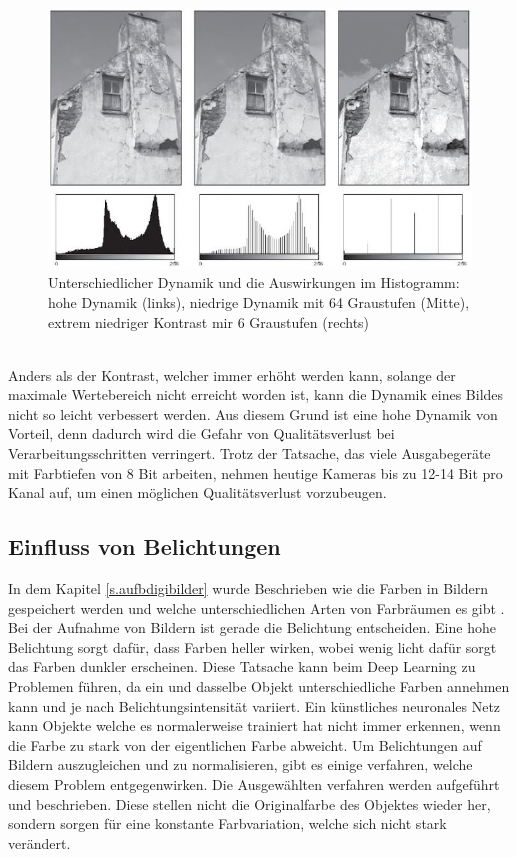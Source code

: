 \documentclass[a4paper,12pt,oneside]{article}
\begin{document}
 \begin{figure}
    [h]
    \centering
    \includegraphics[scale=0.7]{Sources/dynamik.JPG}
    \caption{Unterschiedlicher Dynamik und die Auswirkungen im Histogramm: hohe Dynamik (links), niedrige Dynamik mit 64 Graustufen (Mitte), extrem niedriger Kontrast mir 6 Graustufen (rechts)\cite[45]{burger2009digitale}}
    \label{img:dynamik}
  \end{figure}\\
Anders als der Kontrast, welcher immer erhöht werden kann, solange der maximale Wertebereich nicht erreicht worden ist, kann die Dynamik eines Bildes nicht so leicht verbessert werden. Aus diesem Grund ist eine hohe Dynamik von Vorteil, denn dadurch wird die Gefahr von Qualitätsverlust bei Verarbeitungsschritten verringert. Trotz der Tatsache, das viele Ausgabegeräte mit Farbtiefen von 8 Bit arbeiten, nehmen heutige Kameras bis zu 12-14 Bit pro Kanal auf, um einen möglichen Qualitätsverlust vorzubeugen.
\newpage
\subsection{Einfluss von Belichtungen}\label{s.belichtung}
In dem Kapitel \ref{s.aufbdigibilder} wurde Beschrieben wie die Farben in Bildern gespeichert werden und welche unterschiedlichen Arten von Farbräumen es gibt \cite[41ff.]{burger2009digitale}. Bei der Aufnahme von Bildern ist gerade die Belichtung entscheiden. Eine hohe Belichtung sorgt dafür, dass Farben heller wirken, wobei wenig licht dafür sorgt das Farben dunkler erscheinen. Diese Tatsache kann beim Deep Learning zu Problemen führen, da ein und dasselbe Objekt unterschiedliche Farben annehmen kann und je nach Belichtungsintensität variiert. Ein künstliches neuronales Netz kann Objekte welche es normalerweise trainiert hat nicht immer erkennen, wenn die Farbe zu stark von der eigentlichen Farbe abweicht. Um Belichtungen auf Bildern auszugleichen und zu normalisieren, gibt es einige verfahren, welche diesem Problem entgegenwirken. Die Ausgewählten verfahren werden aufgeführt und beschrieben. Diese stellen nicht die Originalfarbe des Objektes wieder her, sondern sorgen für eine konstante Farbvariation, welche sich nicht stark verändert.
\end{document}
